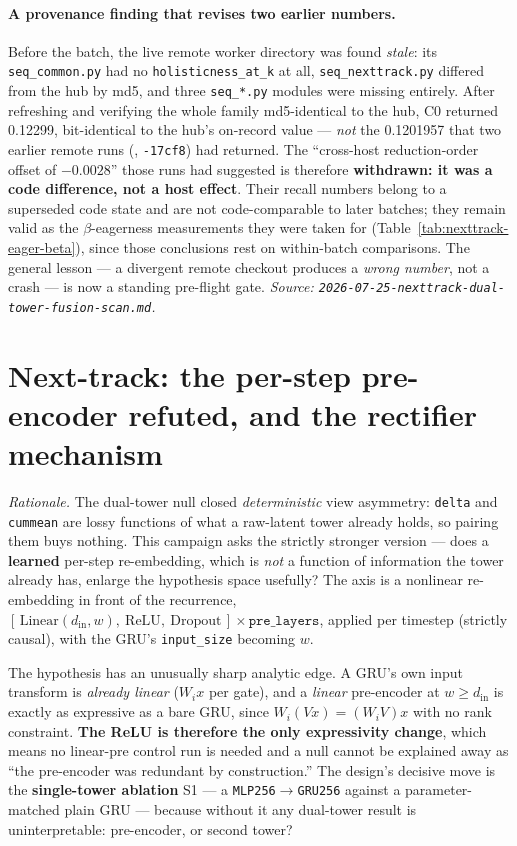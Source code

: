 \documentclass[11pt]{article}
\newcommand{\runid}[1]{\texttt{\small\seqsplit{#1}}}
\begin{document}
\paragraph{A provenance finding that revises two earlier numbers.} Before the
batch, the live remote worker directory was found \emph{stale}: its
\texttt{seq\_common.py} had no \texttt{holisticness\_at\_k} at all,
\texttt{seq\_nexttrack.py} differed from the hub by md5, and three
\texttt{seq\_*.py} modules were missing entirely. After refreshing and verifying
the whole family md5-identical to the hub, C0 returned \num{0.12299},
bit-identical to the hub's on-record value --- \emph{not} the \num{0.1201957}
that two earlier remote runs (\runid{run-20260723-002044-af11a},
\texttt{-17cf8}) had returned. The ``cross-host reduction-order offset of
$-\num{0.0028}$'' those runs had suggested is therefore \textbf{withdrawn: it was
a code difference, not a host effect}. Their recall numbers belong to a
superseded code state and are not code-comparable to later batches; they remain
valid as the $\beta$-eagerness measurements they were taken for
(Table~\ref{tab:nexttrack-eager-beta}), since those conclusions rest on within-batch
comparisons. The general lesson --- a divergent remote checkout produces a
\emph{wrong number}, not a crash --- is now a standing pre-flight gate.
\emph{Source: \texttt{2026-07-25-nexttrack-dual-tower-fusion-scan.md}.}

\section{Next-track: the per-step pre-encoder refuted, and the rectifier mechanism}
\label{sec:nexttrack-preencoder}
\emph{Rationale.} The dual-tower null closed \emph{deterministic} view
asymmetry: \texttt{delta} and \texttt{cummean} are lossy functions of what a
raw-latent tower already holds, so pairing them buys nothing. This campaign asks
the strictly stronger version --- does a \textbf{learned} per-step
re-embedding, which is \emph{not} a function of information the tower already
has, enlarge the hypothesis space usefully? The axis is a nonlinear
re-embedding in front of the recurrence,
$[\,\text{Linear}(d_{\text{in}},w),\ \text{ReLU},\ \text{Dropout}\,]\times
\texttt{pre\_layers}$, applied per timestep (strictly causal), with the GRU's
\texttt{input\_size} becoming $w$.

The hypothesis has an unusually sharp analytic edge. A GRU's own input transform
is \emph{already linear} ($W_i x$ per gate), and a \emph{linear} pre-encoder at
$w \ge d_{\text{in}}$ is exactly as expressive as a bare GRU, since
$W_i(Vx) = (W_iV)x$ with no rank constraint. \textbf{The ReLU is therefore the
only expressivity change}, which means no linear-pre control run is needed and a
null cannot be explained away as ``the pre-encoder was redundant by
construction.'' The design's decisive move is the \textbf{single-tower ablation}
S1 --- a \texttt{MLP256}$\to$\texttt{GRU256} against a parameter-matched plain
GRU --- because without it any dual-tower result is uninterpretable: pre-encoder,
or second tower?
\end{document}
